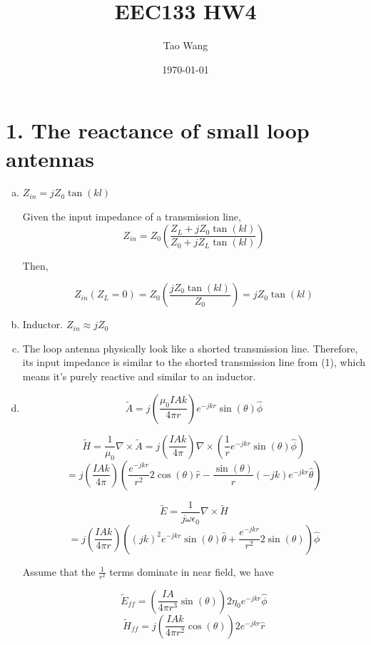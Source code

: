 \documentclass{article} %
\begin{document}
\title{EEC133 HW4}
\author{Tao Wang}
\date{\today}

\maketitle

\section*{1. The reactance of small loop antennas}
\begin{enumerate}[(a)]
      \item $\boxed{Z_{in} = j Z_0 \tan(kl)}$

            Given the input impedance of a transmission line,
            \[Z_{in} = Z_0 \left(\frac{Z_L + j Z_0 \tan(kl)}{Z_0 + j Z_L \tan(kl)}\right)\]

            Then,

            \[Z_{in}(Z_L = 0) = Z_0 \left(\frac{j Z_0 \tan(kl)}{Z_0}\right) = j Z_0 \tan(kl)\]
      \item $\boxed{\text{Inductor}}$. $\boxed{Z_{in} \approx j Z_0}$
      \item The loop antenna physically look like a shorted transmission line. Therefore, its input impedance is similar to the shorted transmission line from (1), which means it's purely reactive and similar to an inductor.
      \item
            \[\widetilde{A} = j \left(\frac{\mu_0 I A k}{4 \pi r}\right) e^{-jkr} \sin(\theta) \hat{\phi}\]

            \[\widetilde{H} = \frac{1}{\mu_0} \nabla \times \widetilde{A} = j \left(\frac{IAk}{4\pi}\right) \nabla \times \left(\frac{1}{r} e^{-jkr} \sin(\theta) \hat{\phi}\right)\]
            \[= j \left(\frac{IAk}{4\pi}\right)\left(\frac{e^{-jkr}}{r^2}2\cos(\theta)\hat{r} - \frac{\sin(\theta)}{r}(-jk)e^{-jkr}\hat{\theta}\right)\]


            \[\widetilde{E} = \frac{1}{j \omega \epsilon_0} \nabla \times \widetilde{H}\]
            \[= j\left(\frac{IAk}{4\pi r}\right)\left((jk)^2 e^{-jkr} \sin(\theta) \hat{\theta} + \frac{e^{-jkr}}{r^2} 2\sin(\theta)\right)\hat{\phi}\]

            Assume that the $\frac{1}{r^2}$ terms dominate in near field, we have

            \[\boxed{\widetilde{E}_{ff} = \left(\frac{IA}{4 \pi r^3} \sin(\theta)\right) 2\eta_0 e^{-jkr}  \hat{\phi}}\]
            \[\boxed{\widetilde{H}_{ff} = j \left(\frac{IAk}{4\pi r^2} \cos(\theta)\right)2e^{-jkr} \hat{r}}\]


\end{enumerate}
\end{document}
